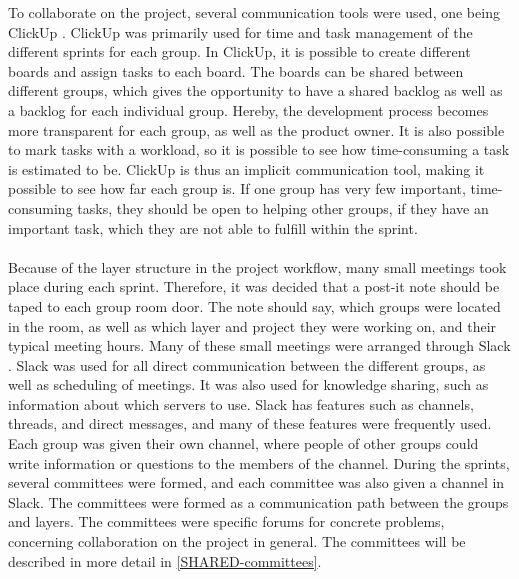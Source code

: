 \tiny {}

To collaborate on the project, several communication tools were used, one being ClickUp \cite{clickup}. ClickUp was primarily used for time and task management of the different sprints for each group. In ClickUp, it is possible to create different boards and assign tasks to each board. The boards can be shared between different groups, which gives the opportunity to have a shared backlog as well as a backlog for each individual group. Hereby, the development process becomes more transparent for each group, as well as the product owner. It is also possible to mark tasks with a workload, so it is possible to see how time-consuming a task is estimated to be. ClickUp is thus an implicit communication tool, making it possible to see how far each group is. If one group has very few important, time-consuming tasks, they should be open to helping other groups, if they have an important task, which they are not able to fulfill within the sprint.
\\\\
Because of the layer structure in the project workflow, many small meetings took place during each sprint. Therefore, it was decided that a post-it note should be taped to each group room door. The note should say, which groups were located in the room, as well as which layer and project they were working on, and their typical meeting hours. 
Many of these small meetings were arranged through Slack \cite{slack}. Slack was used for all direct communication between the different groups, as well as scheduling of meetings. It was also used for knowledge sharing, such as information about which servers to use. Slack has features such as channels, threads, and direct messages, and many of these features were frequently used. Each group was given their own channel, where people of other groups could write information or questions to the members of the channel. During the sprints, several committees were formed, and each committee was also given a channel in Slack. The committees were formed as a communication path between the groups and layers. The committees were specific forums for concrete problems, concerning collaboration on the project in general. The committees will be described in more detail in \autoref{SHARED-committees}.
